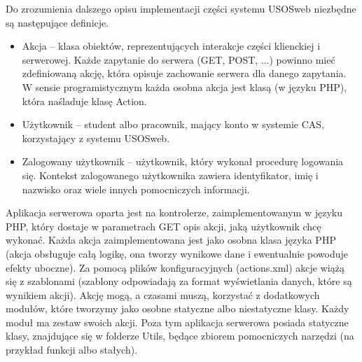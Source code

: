 \documentclass[licencjacka]{pracamgr}
\begin{document}
Do zrozumienia dalszego opisu implementacji części systemu USOSweb niezbędne są następujące definicje.
\begin{itemize}
  \item
  Akcja -- klasa obiektów, reprezentujących interakcje części klienckiej i serwerowej. Każde zapytanie do serwera (GET, POST, ...) powinno mieć zdefiniowaną akcję, która opisuje zachowanie serwera dla danego zapytania. W sensie programistycznym każda osobna akcja jest klasą (w języku PHP), która naśladuje klasę Action.
  \item
  Użytkownik -- student albo pracownik, mający konto w systemie CAS, korzystający z systemu USOSweb.
  \item
  Zalogowany użytkownik -- użytkownik, który wykonał procedurę logowania się. Kontekst zalogowanego użytkownika zawiera identyfikator, imię i nazwisko oraz wiele innych pomocniczych informacji. 
\end{itemize}

Aplikacja serwerowa oparta jest na kontrolerze, zaimplementowanym w języku PHP, który dostaje w parametrach GET opis akcji, jaką użytkownik chcę wykonać. Każda akcja zaimplementowana jest jako osobna klasa języka PHP (akcja obsługuje całą logikę, ona tworzy wynikowe dane i ewentualnie powoduje efekty uboczne). Za pomocą plików konfiguracyjnych (actions.xml) akcje wiążą się z szablonami (szablony odpowiadają za format wyświetlania danych, które są wynikiem akcji). Akcję mogą, a czasami muszą, korzystać z dodatkowych modułów, które tworzymy jako osobne statyczne albo niestatyczne klasy. Każdy moduł ma zestaw swoich akcji. Poza tym aplikacja serwerowa posiada statyczne klasy, znajdujące się w folderze Utils, będące zbiorem pomocniczych narzędzi (na przykład funkcji albo stałych).
\end{document}
